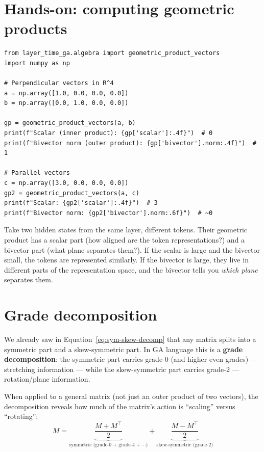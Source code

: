 \documentclass[11pt, twoside, openright]{memoir}
\numberwithin{equation}{chapter}
\begin{document}
\section{Hands-on: computing geometric products}

\begin{lstlisting}[caption={The geometric product of two vectors}]
from layer_time_ga.algebra import geometric_product_vectors
import numpy as np

# Perpendicular vectors in R^4
a = np.array([1.0, 0.0, 0.0, 0.0])
b = np.array([0.0, 1.0, 0.0, 0.0])

gp = geometric_product_vectors(a, b)
print(f"Scalar (inner product): {gp['scalar']:.4f}")  # 0
print(f"Bivector norm (outer product): {gp['bivector'].norm:.4f}")  # 1

# Parallel vectors
c = np.array([3.0, 0.0, 0.0, 0.0])
gp2 = geometric_product_vectors(a, c)
print(f"Scalar: {gp2['scalar']:.4f}")  # 3
print(f"Bivector norm: {gp2['bivector'].norm:.6f}")  # ~0
\end{lstlisting}

\begin{transformer}
Take two hidden states from the same layer, different tokens.  Their
geometric product has a scalar part (how aligned are the token
representations?) and a bivector part (what plane separates them?).
If the scalar is large and the bivector small, the tokens are
represented similarly.  If the bivector is large, they live in different
parts of the representation space, and the bivector tells you
\emph{which plane} separates them.
\end{transformer}

\section{Grade decomposition}

We already saw in Equation~\eqref{eq:sym-skew-decomp} that any matrix
splits into a symmetric part and a skew-symmetric part.  In GA language
this is a \textbf{grade decomposition}: the symmetric part carries
grade-0 (and higher even grades) --- stretching information --- while
the skew-symmetric part carries grade-2 --- rotation/plane information.

When applied to a general matrix (not just an outer product of two
vectors), the decomposition reveals how much of the matrix's action is
``scaling'' versus ``rotating'':
\begin{equation}
  M = \underbrace{\frac{M + M^\top}{2}}_{\text{symmetric (grade-0 + grade-4 + $\cdots$)}}
    + \underbrace{\frac{M - M^\top}{2}}_{\text{skew-symmetric (grade-2)}}
\end{equation}
\end{document}
